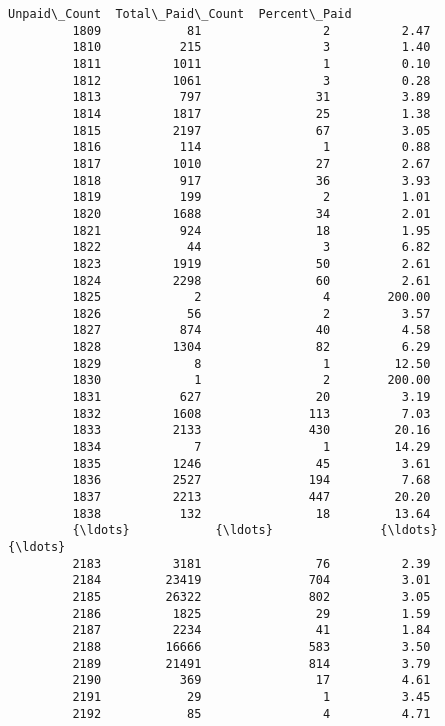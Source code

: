 \documentclass[11pt]{article}
\begin{document}
\begin{Verbatim}[commandchars=\\\{\}]
               Unpaid\_Count  Total\_Paid\_Count  Percent\_Paid  
         1809            81                 2          2.47  
         1810           215                 3          1.40  
         1811          1011                 1          0.10  
         1812          1061                 3          0.28  
         1813           797                31          3.89  
         1814          1817                25          1.38  
         1815          2197                67          3.05  
         1816           114                 1          0.88  
         1817          1010                27          2.67  
         1818           917                36          3.93  
         1819           199                 2          1.01  
         1820          1688                34          2.01  
         1821           924                18          1.95  
         1822            44                 3          6.82  
         1823          1919                50          2.61  
         1824          2298                60          2.61  
         1825             2                 4        200.00  
         1826            56                 2          3.57  
         1827           874                40          4.58  
         1828          1304                82          6.29  
         1829             8                 1         12.50  
         1830             1                 2        200.00  
         1831           627                20          3.19  
         1832          1608               113          7.03  
         1833          2133               430         20.16  
         1834             7                 1         14.29  
         1835          1246                45          3.61  
         1836          2527               194          7.68  
         1837          2213               447         20.20  
         1838           132                18         13.64  
         {\ldots}            {\ldots}               {\ldots}           {\ldots}  
         2183          3181                76          2.39  
         2184         23419               704          3.01  
         2185         26322               802          3.05  
         2186          1825                29          1.59  
         2187          2234                41          1.84  
         2188         16666               583          3.50  
         2189         21491               814          3.79  
         2190           369                17          4.61  
         2191            29                 1          3.45  
         2192            85                 4          4.71  

\end{Verbatim}
\end{document}
